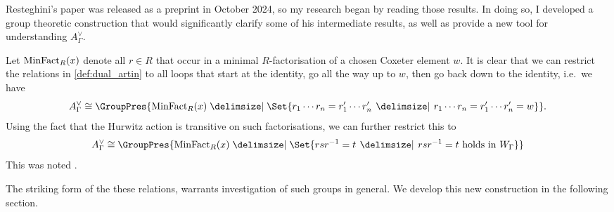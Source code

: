 Resteghini's paper \cite{resteghini_free_2024} was released as a preprint in October 2024, so my research began by reading those results.
In doing so, I developed a group theoretic construction that would significantly clarify some of his intermediate results, as well as provide a new tool for understanding $A^\vee_\Gamma$.

Let $\operatorname{MinFact}_R(x)$ denote all  $r \in R$ that occur in a minimal  $R$-factorisation of a chosen Coxeter element  $w$.
It is clear that we can restrict the relations in \cref{def:dual_artin} to all loops that start at the identity, go all the way up to $w$, then go back down to the identity, i.e.~we have
\[
	A^\vee_\Gamma \cong \GroupPres{ \minfact_R(x) \relations \Set{r_1\cdots r_n = r^\prime_1 \cdots r^\prime_n \given r_1 \cdots r_n = r^\prime_1 \cdots r^\prime_n = w}}
	.\]
Using the fact that the Hurwitz action is transitive on such factorisations, we can further restrict this to
\[
	A^\vee_\Gamma \cong \GroupPres{ \minfact_R(x) \relations \Set{rsr^{-1} = t \given rs r ^{-1} = t \text{ holds in } W_\Gamma}}
\]
This was noted \cite[Lemma 7.11]{bessis_topology_2004}.

The striking form of the these relations, warrants investigation of such groups in general.
We develop this new construction in the following section.



